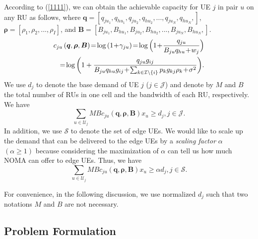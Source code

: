 \documentclass[10pt,journal,final,finalsubmission,twocolumn]{IEEEtran}
\begin{document}
According to (\ref{1111}), we can obtain the achievable capacity for UE $j$ in pair $u$ on any RU as follows, where $\boldsymbol{q}=[q_{ju_1},q_{hu_1},q_{ju_2},q_{hu_2},...,q_{ju_N},q_{hu_N},]$, $\boldsymbol{\rho}=[\rho_1,\rho_2,..., \rho_I]$, and $\boldsymbol{B}=[B_{ju_1},B_{hu_1},B_{ju_2},B_{hu_2},...,B_{ju_N},B_{hu_N},]$.
\begin{align}
c_{ju}\left (\boldsymbol{q},\boldsymbol{ \rho}, \boldsymbol{B}\right )\!=\!\log \left ( 1\!+\!\gamma_{ju} \right )\!=\!\log \Big ( 1\!+\!\frac{q_{ju}}{B_{ju}q_{hu}\!+\!w_j} \Big )\notag\\
=\!\log \bigg ( 1+\frac{q_{ju}g_{ij}}{{B_{ju}q_{hu}g_{ij}}\!+\!{\sum_{k\in \mathcal{I}\setminus \left \{ i \right \}}p_kg_{kj}\rho_k}\!+\!\sigma ^2} \bigg ).
\end{align}
We use $d_j$ to denote the base demand of UE $j$ ($j \in \mathcal{J}$) and denote by $M$ and $B$ the total number of RUs in one cell and the bandwidth of each RU, respectively. We have
\begin{equation}
\sum\limits_{u\in {\mathcal{U}}_j} M B c_{ju}\left (\boldsymbol{q},\boldsymbol{ \rho}, \boldsymbol{B}\right )x_u\geq d_j, j \in \mathcal{J}.
\end{equation}
In addition, we use $\mathcal{S}$ to denote the set of edge UEs. We would like to scale up the demand that can be delivered to the edge UEs by a {\em scaling factor} $\alpha$ $\left (\alpha \geq 1\right)$ because considering the maximization of $\alpha$ can tell us how much NOMA can offer to edge UEs. Thus, we have
\begin{equation}
\sum\limits_{u\in {\mathcal{U}}_j} M B c_{ju}\left (\boldsymbol{q},\boldsymbol{ \rho}, \boldsymbol{B}\right )x_u\geq \alpha d_j,j\in \mathcal{S}.
\end{equation}

For convenience, in the following discussion, we use normalized $d_j$ such that two notations $M$ and $B$ are not necessary.

\subsection{Problem Formulation}\label{MathematicalFormulation}
\end{document}
